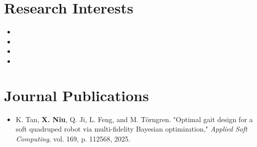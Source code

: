 \documentclass[a4paper,11pt]{article}
\newcommand{\resumeSubHeadingListStart}{\begin{itemize}[leftmargin=*,labelsep=0mm,itemsep=-2pt]}
\newcommand{\resumeSubHeadingListEnd}{\end{itemize}\vspace{2mm}}
\begin{document}
\section{\textbf{Research Interests}}
\vspace{-2.5mm}
\begin{multicols}{2}
  \resumeSubHeadingListStart
    \item \hspace{0.5em}{Cyber-Physical Systems}
    \item \hspace{0.5em}{Reinforcement Learning}
    \item \hspace{0.5em}{Control \& Dynamics}
    \item \hspace{0.5em}{Heterogeneous Robots Collaboration}
  \resumeSubHeadingListEnd
\vspace{-5.5mm}
\end{multicols}

\section{\textbf{Journal Publications}}
\resumeSubHeadingListStart
  \vspace{3mm}
  \item \hspace{0.3mm} K. Tan, \textbf{X. Niu}, Q. Ji, L. Feng, and M. Törngren. "Optimal gait design for a soft quadruped robot via multi-fidelity Bayesian optimization," \textit{Applied Soft Computing}, vol. 169, p. 112568, 2025.
  
\resumeSubHeadingListEnd
\vspace{-5.5mm}

\end{document}
